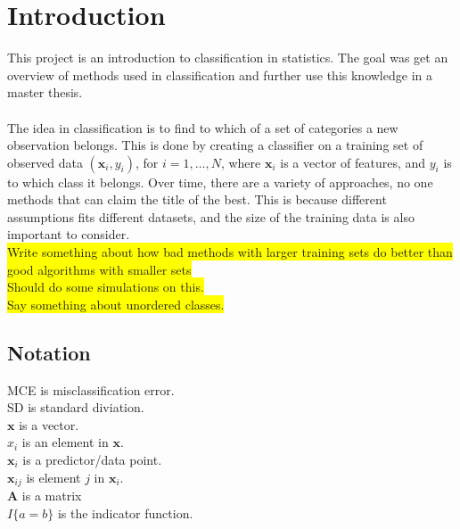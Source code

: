 \section{Introduction}
\label{sec:Introduction}
This project is an introduction to classification in statistics. The goal was get an overview of methods used in classification and further use this knowledge in a master thesis. \\
\\
The idea in classification is to find to which of a set of categories a new observation belongs. This is done by creating a classifier on a training set of observed data $(\mathbf{x}_i, y_i)$, for $i = 1, \ldots, N$, where $\mathbf{x}_i$ is a vector of features, and $y_i$ is to which class it belongs. Over time, there are a variety of approaches, no one methods that can claim the title of the best. This is because different assumptions fits different datasets, and the size of the training data is also important to consider. \\
\colorbox{yellow}{Write something about how bad methods with larger training sets do better than good algorithms with smaller sets}\\
\colorbox{yellow}{Should do some simulations on this.}\\
\colorbox{yellow}{Say something about unordered classes.}


\subsection{Notation}
\label{sub:Notation}
MCE is misclassification error. \\
SD is standard diviation. \\
$\mathbf{x}$ is a vector. \\
$x_i$ is an element in $\mathbf{x}$. \\
$\mathbf{x}_i$ is a predictor/data point.  \\
$\mathbf{x}_{ij}$ is element $j$ in $\mathbf{x}_i$. \\
$\mathbf{A}$ is a matrix \\
$I\{a = b\}$ is the indicator function.\\
